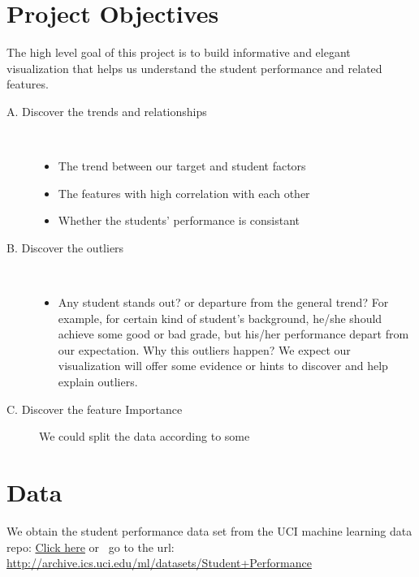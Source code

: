\documentclass{article}
\begin{document}
\section{Project Objectives}
The high level goal of this project is to build informative and elegant visualization that helps us understand the student performance and related features.
\begin{description}
\item [A. Discover the trends and relationships]  \
\begin{itemize}
\item The trend between our target and student factors
\item The features with high correlation with each other
\item Whether the students' performance is consistant
\end{itemize}

\item [B. Discover the outliers]  \
\begin{itemize}
\item Any student stands out? or departure from the general trend? For example, for certain kind of student's background, he/she should achieve some good or bad grade, but his/her performance depart from our expectation. Why this outliers happen? We expect our visualization will offer some evidence or hints to discover and help explain outliers.
\end{itemize}
\item [C. Discover the feature Importance] We could split the data according to some 
\end{description}

\section{Data}
We obtain the student performance data set from the UCI machine learning data repo: \href{http://archive.ics.uci.edu/ml/datasets/Student+Performance}{Click here} or \
go to the url: \url{http://archive.ics.uci.edu/ml/datasets/Student+Performance}
\end{document}
